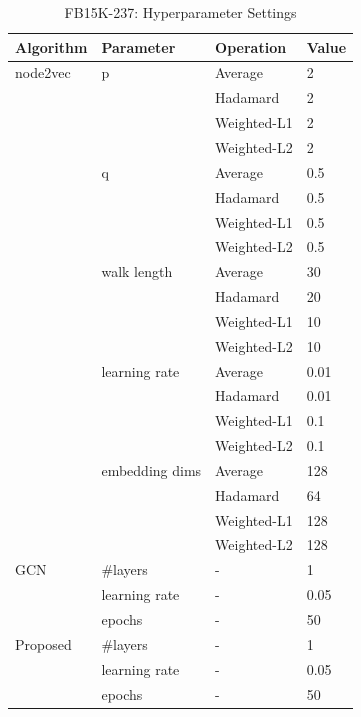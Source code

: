\documentclass[sigconf]{acmart}
\begin{document}
\begin{table}[!ht]
    \centering
    \caption{FB15K-237: Hyperparameter Settings}
    \label{tab:lp-hyper}
    \begin{tabular}{llll}
        \toprule
        \textbf{Algorithm} & \textbf{Parameter} & \textbf{Operation}& \textbf{Value}\\
        \midrule
        node2vec & p & Average & 2\\
                 & & Hadamard & 2\\
                 & & Weighted-L1 & 2\\
                 & & Weighted-L2 & 2\\
                 & q & Average & 0.5\\
                 & & Hadamard & 0.5\\
                 & & Weighted-L1 & 0.5\\
                 & & Weighted-L2 & 0.5\\
                 & walk length & Average & 30\\
                 & & Hadamard & 20\\
                 & & Weighted-L1 & 10\\
                 & & Weighted-L2 & 10\\
                 & learning rate & Average & 0.01\\
                 & & Hadamard & 0.01\\
                 & & Weighted-L1 & 0.1\\
                 & & Weighted-L2 & 0.1\\
                 & embedding dims & Average & 128\\
                 & & Hadamard & 64\\
                 & & Weighted-L1 & 128\\
                 & & Weighted-L2 & 128\\
        GCN & \#layers & - & 1\\
            & learning rate & - & 0.05\\
            & epochs & - & 50\\
        Proposed & \#layers & - & 1\\
                 & learning rate & - & 0.05\\
                 & epochs & - & 50\\
       \bottomrule
    \end{tabular}
\end{table}
\end{document}
